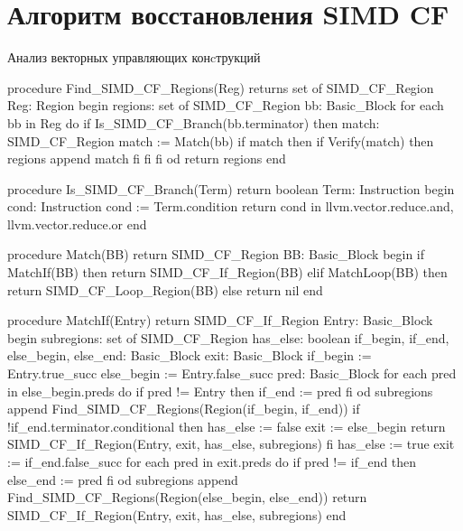\chapter{Алгоритм восстановления SIMD CF}\label{app:A}

\begin{ListingEnv}[!h]
    \captiondelim{ } 
    \caption{Анализ векторных управляющих конcтрукций}\label{lst:simdcf-analysis}
    \begin{Verb}
procedure Find_SIMD_CF_Regions(Reg) returns set of SIMD_CF_Region
  Reg: Region
begin
  regions: set of SIMD_CF_Region
  bb: Basic_Block
  for each bb in Reg do
    if Is_SIMD_CF_Branch(bb.terminator) then
      match: SIMD_CF_Region
      match := Match(bb)
      if match then
        if Verify(match) then
          regions append match
        fi
      fi
    fi
  od
  return regions
end

procedure Is_SIMD_CF_Branch(Term) return boolean
  Term: Instruction
begin
  cond: Instruction
  cond := Term.condition
  return cond in {llvm.vector.reduce.and, llvm.vector.reduce.or}
end
    \end{Verb}
\end{ListingEnv}

\begin{ListingEnv}[!h]
    \captiondelim{ }     
    \begin{Verb}
procedure Match(BB) return SIMD_CF_Region
  BB: Basic_Block
begin
  if MatchIf(BB) then
    return SIMD_CF_If_Region(BB)
  elif MatchLoop(BB) then
    return SIMD_CF_Loop_Region(BB)
  else
    return nil
end

procedure MatchIf(Entry) return SIMD_CF_If_Region
  Entry: Basic_Block
begin
  subregions: set of SIMD_CF_Region
  has_else: boolean
  if_begin, if_end, else_begin, else_end: Basic_Block
  exit: Basic_Block
  if_begin := Entry.true_succ
  else_begin := Entry.false_succ
  pred: Basic_Block
  for each pred in else_begin.preds do
    if pred != Entry then
      if_end := pred
    fi
  od
  subregions append Find_SIMD_CF_Regions(Region(if_begin, if_end))
  if !if_end.terminator.conditional then
    has_else := false
    exit := else_begin
    return SIMD_CF_If_Region(Entry, exit, has_else, subregions)
  fi
  has_else := true
  exit := if_end.false_succ
  for each pred in exit.preds do
    if pred != if_end then
      else_end := pred
    fi
  od
  subregions append Find_SIMD_CF_Regions(Region(else_begin, else_end))
  return SIMD_CF_If_Region(Entry, exit, has_else, subregions)
end
    \end{Verb}
\end{ListingEnv}

